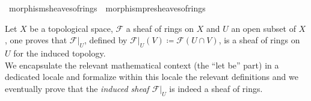 \documentclass[12pt]{scrartcl}
\begin{document}
\begin{isabelle}
\isamarkupfalse%
\ morphism{\isacharunderscore}{\kern0pt}sheaves{\isacharunderscore}{\kern0pt}of{\isacharunderscore}{\kern0pt}rings\ {\isacharequal}{\kern0pt}\ morphism{\isacharunderscore}{\kern0pt}presheaves{\isacharunderscore}{\kern0pt}of{\isacharunderscore}{\kern0pt}rings
\end{isabelle}

Let $X$ be a topological space, $\mathscr{F}$ a sheaf of rings on $X$ and $U$ an open subset of $X$,  one proves that $\mathscr{F}|_U$, defined by $\mathscr{F}|_U(V) \coloneqq \mathscr{F}(U \cap V)$, is a sheaf of rings on $U$ for the induced topology. \\
We encapsulate the relevant mathematical context (the ``let be'' part) in a dedicated locale and formalize within this locale the relevant definitions and we eventually prove  that the \emph{induced sheaf $\mathscr{F}|_U$} is indeed a sheaf of rings.
\end{document}
